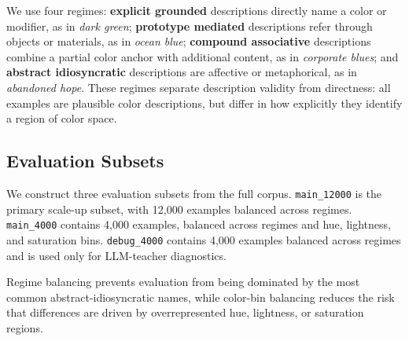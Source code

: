 \documentclass[11pt]{article}
\begin{document}

We use four regimes: \textbf{explicit grounded} descriptions directly name a
color or modifier, as in \textit{dark green}; \textbf{prototype mediated}
descriptions refer through objects or materials, as in \textit{ocean blue};
\textbf{compound associative} descriptions combine a partial color anchor
with additional content, as in \textit{corporate blues}; and
\textbf{abstract idiosyncratic} descriptions are affective or metaphorical,
as in \textit{abandoned hope}. These regimes separate description validity
from directness: all examples are plausible color descriptions, but differ
in how explicitly they identify a region of color space.

\subsection{Evaluation Subsets}
\label{sec:subsets}

We construct three evaluation subsets from the full corpus.
\texttt{main\_12000} is the primary scale-up subset, with 12{,}000 examples
balanced across regimes. \texttt{main\_4000} contains 4{,}000 examples,
balanced across regimes and hue, lightness, and saturation bins.
\texttt{debug\_4000} contains 4{,}000 examples balanced across regimes and
is used only for LLM-teacher diagnostics.

Regime balancing prevents evaluation from being dominated by the most common
abstract-idiosyncratic names, while color-bin balancing reduces the risk
that differences are driven by overrepresented hue, lightness, or saturation
regions.
\end{document}
